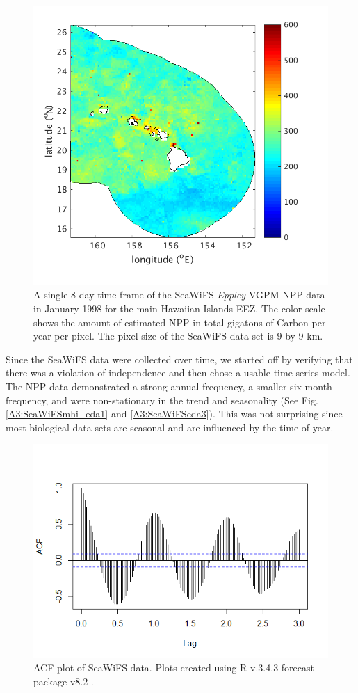 \documentclass[oneside,12pt,final]{sty/ucthesis-CA2012}
\let\cite\citep                             %
\begin{document}
\begin{mainmatter}
\begin{figure}[H]
     \centering
       \includegraphics[width=.7\textwidth]{fig/SeaWiFSmhi}
    \caption{A single 8-day time frame of the SeaWiFS \textit{Eppley-}VGPM NPP data in January 1998 for the main Hawaiian Islands EEZ. The color scale shows the amount of estimated NPP in total gigatons of Carbon per year per pixel. The pixel size of the SeaWiFS data set is 9 by 9 km.}
    \label{A3:SeaWiFSmhi}
\end{figure}

Since the SeaWiFS data were collected over time, we started off by verifying that there was a violation of independence and then chose a usable time series model. The NPP data demonstrated a strong annual frequency, a smaller six month frequency, and were non-stationary in the trend and seasonality (See Fig. \ref{A3:SeaWiFSmhi_eda1}  and \ref{A3:SeaWiFSeda3}). This was not surprising since most biological data sets are seasonal and are influenced by the time of year. 

\begin{figure}[H]
     \centering
       \includegraphics[width=.7\textwidth]{fig/seawifs_acf}
    \caption{ACF plot of SeaWiFS data. Plots created using R v.3.4.3 \cite{Rcite} forecast package v8.2 \cite{forecast1, forecast2}.}
    \label{A3:SeaWiFSeda1}
\end{figure}


\end{mainmatter}
\end{document}
